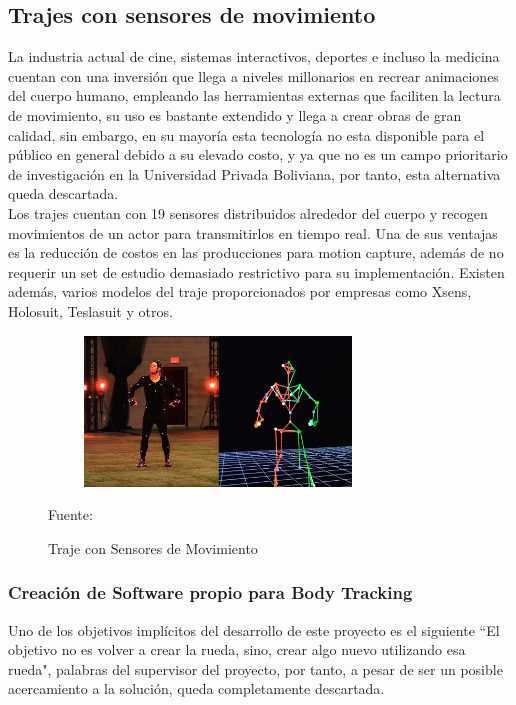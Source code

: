 \subsection{Trajes con sensores de movimiento}

La industria actual de cine, sistemas interactivos, deportes e incluso la medicina cuentan con una inversión que llega a niveles millonarios en recrear animaciones del cuerpo humano, empleando las herramientas externas que faciliten la lectura de movimiento, su uso es bastante extendido y llega a crear obras de gran calidad, sin embargo, en su mayoría esta tecnología no esta disponible para el público en general debido a su elevado costo, y ya que no es un campo prioritario de investigación en la Universidad Privada Boliviana, por tanto, esta alternativa queda descartada.
\\
Los trajes cuentan con 19 sensores distribuidos alrededor del cuerpo y recogen movimientos de un actor para transmitirlos en tiempo real. Una de sus ventajas es la reducción de costos en las producciones para motion capture, además de no requerir un set de estudio demasiado restrictivo para su implementación. Existen además, varios modelos del traje proporcionados por empresas como Xsens, Holosuit, Teslasuit y otros.

\begin{figure}[t!]
	\centering
	\includegraphics[width=9cm,height=4cm,]{./Images/trajesensor.jpg}
	\caption{Traje con Sensores de Movimiento}
	\footnotesize Fuente: \cite{trajesensor}
	\label{trajesensores}
\end{figure}

\subsubsection{Creación de Software propio para Body Tracking}

Uno de los objetivos implícitos del desarrollo de este proyecto es el siguiente ``El objetivo no es volver a crear la rueda, sino, crear algo nuevo utilizando esa rueda", palabras del supervisor del proyecto, por tanto, a pesar de ser un posible acercamiento a la solución, queda completamente descartada.

